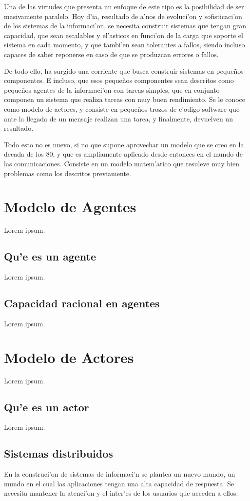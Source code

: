 \documentclass[12pt]{article}
\begin{document}
Una de las virtudes que presenta un enfoque de este tipo es la posibilidad de ser masivamente
paralelo. Hoy d'ia, resultado de a'nos de evoluci'on y sofisticaci'on de los sistemas de la informaci'on,
se necesita construir sistemas que tengan gran capacidad, que sean escalables y el'asticos
en funci'on de la carga que soporte el sistema en cada momento, y que tambi'en sean tolerantes
a fallos, siendo incluso capaces de saber reponerse en caso de que se produzcan errores o fallos.

De todo ello, ha surgido una corriente que busca construir sistemas en pequeños componentes. E incluso,
que esos pequeños componentes sean descritos como pequeños agentes de la informaci'on con tareas simples,
que en conjunto componen un sistema que realiza tareas con muy buen rendimiento. Se le conoce como modelo de
actores, y consiste en pequeños trozos de c'odigo software que ante la llegada de un mensaje realizan
una tarea, y finalmente, devuelven un resultado.

Todo esto no es nuevo, si no que supone aprovechar un modelo que se creo en la decada de los 80, y
que es ampliamente aplicado desde entonces en el mundo de las comunicaciones. Consiste en un
modelo matem'atico que resuleve muy bien problemas como los descritos previamente.

\section{Modelo de Agentes}
\label{sec:modelo de agentes}
Lorem ipsum.
\subsection{Qu'e es un agente}
\label{sub:que es un agente}
Lorem ipsum.
\subsection{Capacidad racional en agentes}
\label{sub:capacidad racional en agentes}
Lorem ipsum.
\section{Modelo de Actores}
\label{sec:modelos de actores}
Lorem ipsum.
\subsection{Qu'e es un actor}
\label{sub:que es un actor}
Lorem ipsum.
\subsection{Sistemas distribuidos}
\label{sub:sistemas distribuidos}
En la construci'on de sistemas de informaci'n se plantea un nuevo mundo, un mundo en el cual
las aplicaciones tengan una alta capacidad de respuesta. Se necesita mantener la atenci'on y el
inter'es de los usuarios que acceden a ellos.
\end{document}
